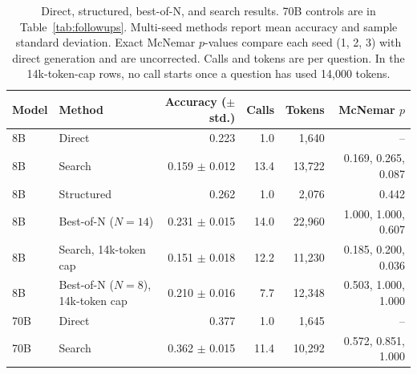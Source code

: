 \begin{table}[ht]
\centering
\small
\caption{Direct, structured, best-of-N, and search results. 70B controls are in Table~\ref{tab:followups}. Multi-seed methods report mean accuracy and sample standard deviation. Exact McNemar $p$-values compare each seed (1, 2, 3) with direct generation and are uncorrected. Calls and tokens are per question. In the 14k-token-cap rows, no call starts once a question has used 14,000 tokens.}
\label{tab:main-results}
\begin{tabular}{llrrrr}
\toprule
Model & Method & Accuracy ($\pm$ std.) & Calls & Tokens & McNemar $p$ \\
\midrule
8B & Direct & 0.223 & 1.0 & 1,640 & -- \\
8B & Search & 0.159 $\pm$ 0.012 & 13.4 & 13,722 & 0.169, 0.265, 0.087 \\
8B & Structured & 0.262 & 1.0 & 2,076 & 0.442 \\
8B & Best-of-N ($N{=}14$) & 0.231 $\pm$ 0.015 & 14.0 & 22,960 & 1.000, 1.000, 0.607 \\
8B & Search, 14k-token cap & 0.151 $\pm$ 0.018 & 12.2 & 11,230 & 0.185, 0.200, 0.036 \\
8B & Best-of-N ($N{=}8$), 14k-token cap & 0.210 $\pm$ 0.016 & 7.7 & 12,348 & 0.503, 1.000, 1.000 \\
\midrule
70B & Direct & 0.377 & 1.0 & 1,645 & -- \\
70B & Search & 0.362 $\pm$ 0.015 & 11.4 & 10,292 & 0.572, 0.851, 1.000 \\
\bottomrule
\end{tabular}
\end{table}
